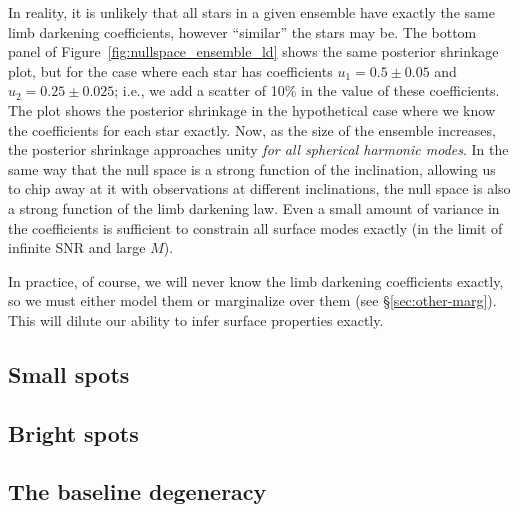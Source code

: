 \documentclass[modern]{aastex62}
\begin{document}
In reality, it is unlikely that all stars in a given ensemble have exactly
the same limb darkening coefficients, however ``similar'' the stars may be.
The bottom panel of Figure~\ref{fig:nullspace_ensemble_ld} shows the same
posterior shrinkage plot, but for the case where each star has coefficients
$u_1 = 0.5 \pm 0.05$ and $u_2 = 0.25 \pm 0.025$; i.e., we add a scatter of
10\% in the value of these coefficients. The plot shows the posterior
shrinkage in the hypothetical case where we know the coefficients for
each star exactly. Now, as the size of the ensemble increases, the posterior
shrinkage approaches unity \emph{for all spherical harmonic modes}.
In the same way that the null space is a strong function of the inclination,
allowing us to chip away at it with observations at different inclinations,
the null space is also a strong function of the limb darkening law. Even a
small amount of variance in the coefficients is sufficient to constrain all surface
modes exactly (in the limit of infinite SNR and large $M$).

In practice, of course, we will never know the limb darkening coefficients
exactly, so we must either model them or marginalize over them
(see \S\ref{sec:other-marg}). This will dilute our ability to infer surface
properties exactly.

\subsection{Small spots}
\label{sec:tinyspots}

\subsection{Bright spots}
\label{sec:brightspots}

\subsection{The baseline degeneracy}
\label{sec:breaking_baseline_degeneracy}
\end{document}
